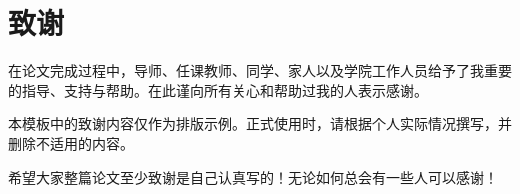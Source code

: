 \chapter*{致谢}

在论文完成过程中，导师、任课教师、同学、家人以及学院工作人员给予了我重要的指导、支持与帮助。在此谨向所有关心和帮助过我的人表示感谢。

本模板中的致谢内容仅作为排版示例。正式使用时，请根据个人实际情况撰写，并删除不适用的内容。

希望大家整篇论文至少致谢是自己认真写的！无论如何总会有一些人可以感谢！